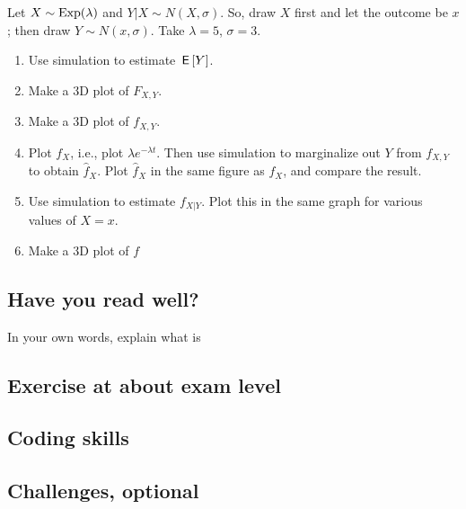 \documentclass[../../assignments/assignments]{subfiles}
\begin{document}
\begin{todo}
Let $X\sim\mathrm{Exp}(\lambda)$ and $Y| X \sim N(X, \sigma)$. So,  draw $X$ first and let the outcome be $x$;  then draw $Y\sim N(x, \sigma)$. Take $\lambda = 5$, $\sigma=3$.
\begin{enumerate}
\item Use simulation to estimate $\,\mathsf{E}\left[Y\right]$.
\item Make a 3D plot of $F_{X,Y}$.
\item Make a 3D plot of $f_{X,Y}$.
\item Plot $f_{X}$, i.e., plot $\lambda e^{-\lambda t}$.
  Then use simulation to marginalize out $Y$ from $f_{X,Y}$ to obtain $\hat f_X$.
  Plot $\hat f_X$ in the same figure as $f_X$, and compare the result.
\item Use simulation to estimate $f_{X|Y}$. Plot this in the same graph for various values of $X=x$.
\item Make a 3D plot of $f$
\end{enumerate}
\end{todo}




\subsection{Have you read well?}


\begin{exercise}
In your own words, explain what is
\begin{hint}
\end{hint}
\begin{solution}
\end{solution}
\end{exercise}




\subsection{Exercise at about exam level}



\subsection{Coding skills}




\subsection{Challenges, optional}
\end{document}
